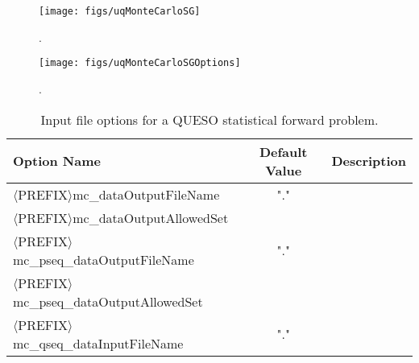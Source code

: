 \begin{figure}[htpb]
\centering
\texttt{[image: figs/uqMonteCarloSG]}
\vspace*{-8pt}
\caption{{\color{red}{The Monte Carlo sequence generator class}}.}
\label{fig-monte-carlo-solver-class}
\end{figure}

\begin{figure}[htpb]
\centering
\texttt{[image: figs/uqMonteCarloSGOptions]}
\vspace*{-8pt}
\caption{{\color{red}{The Monte Carlo sequence generator options class}}.}
\label{fig-monte-carlo-options-class}
\end{figure}

\begin{table}[htpb]
\begin{center}
\caption{Input file options for a QUESO statistical forward problem.}
\label{tab-monte-carlo-options}
\ttfamily
\begin{tabular}{l c  m{6cm}}
\toprule
\rmfamily Option Name     & \rmfamily Default Value &  \rmfamily Description \\ %
\midrule\midrule
$\langle$PREFIX$\rangle$mc\_dataOutputFileName           &   "."   &             \\ %
$\langle$PREFIX$\rangle$mc\_dataOutputAllowedSet         &         &             \\ %
$\langle$PREFIX$\rangle$mc\_pseq\_dataOutputFileName     &    "."  &             \\ %
$\langle$PREFIX$\rangle$mc\_pseq\_dataOutputAllowedSet   &         &             \\ %
$\langle$PREFIX$\rangle$mc\_qseq\_dataInputFileName      &   "."   &             \\ %

\end{tabular}
\end{center}
\end{table}
